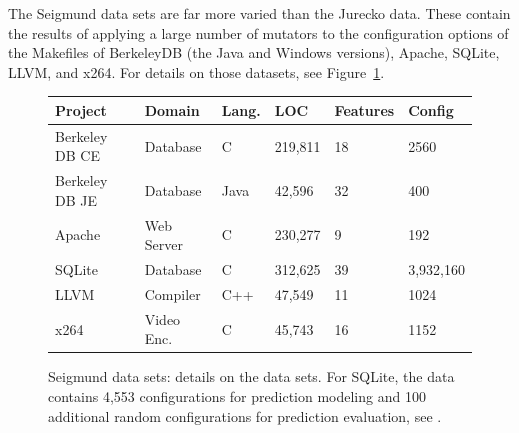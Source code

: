 \documentclass[conference]{IEEEtran}
\newcommand{\fig}[1]{Figure~\ref{fig:#1}}
\begin{document}
  The Seigmund data sets are far more varied than the Jurecko data.
  These contain the results of applying a large number of mutators
  to the configuration options of the Makefiles of  BerkeleyDB (the Java  and  Windows  versions),  Apache,  SQLite,  LLVM, and x264. For details on those datasets, see \fig{cpm}.
  


 

\begin{figure}[!t]
\scriptsize
\begin{tabular}{llllll}
  \hline
  \rowcolor{lightgray}
Project & Domain & Lang. & LOC & Features & Config\\\hline
Berkeley DB CE & Database & C & 219,811 & 18 & 2560\\
Berkeley DB JE & Database & Java & 42,596 & 32  & 400\\
Apache & Web Server & C & 230,277 & 9 & 192\\
SQLite & Database & C & 312,625 & 39 & 3,932,160\\
LLVM & Compiler & C++ & 47,549 & 11 & 1024\\
x264 & Video Enc. & C& 45,743 & 16 & 1152\\\hline
\end{tabular}
 
\caption{Seigmund data sets: details on the data sets.
For SQLite, the data  contains 4,553 configurations for prediction modeling and 100 additional random configurations for prediction evaluation, see \cite{vapp}.}\label{fig:cpm}
\end{figure}



  
  




\end{document}
